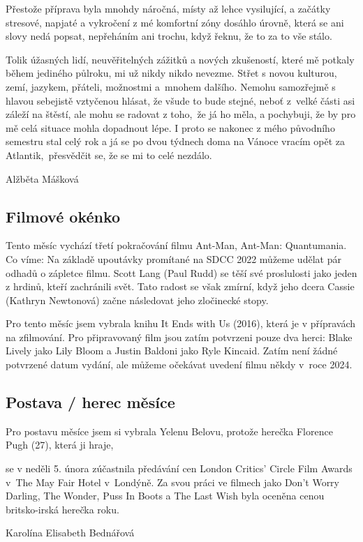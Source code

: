 \documentclass[12pt, a4paper]{article}
\begin{document}
\begin{multicols*}{2}
        Přestože příprava byla mnohdy náročná, místy až lehce vysilující, a začátky stresové, napjaté a vykročení z mé komfortní zóny dosáhlo úrovně, která se ani slovy nedá popsat, nepřeháním ani trochu, když řeknu, že to za to vše stálo.

        Tolik úžasných lidí, neuvěřitelných zážitků a nových zkušeností, které mě potkaly během jediného půlroku, mi už nikdy nikdo nevezme. Střet s novou kulturou, zemí, jazykem, přáteli, možnostmi a~mnohem dalšího. Nemohu samozřejmě s hlavou sebejistě vztyčenou hlásat, že všude to bude stejné, neboť z~velké části asi záleží na štěstí, ale mohu se radovat z toho,~že já ho měla, a pochybuji, že by pro mě celá situace mohla dopadnout lépe. I proto se nakonec z mého původního semestru stal celý rok a já se po dvou týdnech doma na Vánoce vracím opět za Atlantik,~přesvědčit se, že se mi to celé nezdálo.

        \begin{flushright}
			\footnotesize 
            Alžběta Mášková 
		\end{flushright}

        \begin{center}\section*{Filmové okénko}\end{center}

        Tento měsíc vychází třetí pokračování filmu Ant-Man, Ant-Man: Quantumania.
        Co víme: Na základě upoutávky promítané na SDCC 2022 můžeme udělat pár odhadů o zápletce filmu. Scott Lang (Paul Rudd) se těší své proslulosti jako jeden z hrdinů, kteří zachránili svět. Tato radost se však zmírní, když jeho dcera Cassie (Kathryn Newtonová) začne následovat jeho zločinecké stopy.
            
        Pro tento měsíc jsem vybrala knihu It Ends with Us (2016), která je v přípravách na zfilmování. Pro připravovaný film jsou zatím potvrzeni pouze dva herci: Blake Lively jako Lily Bloom a Justin Baldoni jako Ryle Kincaid. Zatím není žádné potvrzené datum vydání, ale můžeme očekávat uvedení filmu někdy v~roce 2024.

        \subsection*{Postava / herec měsíce}
        Pro postavu měsíce jsem si vybrala Yelenu Belovu, protože herečka Florence Pugh (27), která ji hraje, 
        \setlength{\intextsep}{0pt}
        \setlength{\columnsep}{12pt}

        se v neděli 5. února zúčastnila předávání cen London Critics' Circle Film Awards v~The May Fair Hotel v~Londýně. Za svou práci ve filmech jako Don’t Worry Darling, The Wonder, Puss In Boots a The Last Wish byla oceněna cenou britsko-irská herečka roku.
        \begin{flushright}
			\footnotesize 
            Karolína Elisabeth Bednářová
		\end{flushright}



    \end{multicols*}

    
\end{document}
